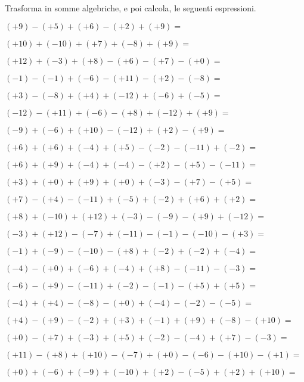 \begin{esercizio}
Trasforma in somme algebriche, e poi calcola, le seguenti espressioni.
 \label{ese:as}
 \begin{enumeratees}
\item \((+9) - (+5) + (+6) - (+2) + (+9) =\)
\item \((+10) + (-10) + (+7) + (-8) + (+9) =\)
\item \((+12) + (-3) + (+8) - (+6) - (+7) - (+0) =\)
\item \((-1) - (-1) + (-6) - (+11) - (+2) - (-8) =\)
\item \((+3) - (-8) + (+4) + (-12) + (-6) + (-5) =\)
\item \((-12) - (+11) + (-6) - (+8) + (-12) + (+9) =\)
\item \((-9) + (-6) + (+10) - (-12) + (+2) - (+9) =\)
\item \((+6) + (+6) + (-4) + (+5) - (-2) - (-11) + (-2) =\)
\item \((+6) + (+9) + (-4) + (-4) - (+2) - (+5) - (-11) =\)
\item \((+3) + (+0) + (+9) + (+0) + (-3) - (+7) - (+5) =\)
\item \((+7) - (+4) - (-11) + (-5) + (-2) + (+6) + (+2) =\)
\item \((+8) + (-10) + (+12) + (-3) - (-9) - (+9) + (-12) =\)
\item \((-3) + (+12) - (-7) + (-11) - (-1) - (-10) - (+3) =\)
\item \((-1) + (-9) - (-10) - (+8) + (-2) + (-2) + (-4) =\)
\item \((-4) - (+0) + (-6) + (-4) + (+8) - (-11) - (-3) =\)
\item \((-6) - (+9) - (-11) + (-2) - (-1) - (+5) + (+5) =\)
\item \((-4) + (+4) - (-8) - (+0) + (-4) - (-2) - (-5) =\)
\item \((+4) - (+9) - (-2) + (+3) + (-1) + (+9) + (-8) - (+10) =\)
\item \((+0) - (+7) + (-3) + (+5) + (-2) - (-4) + (+7) - (-3) =\)
\item \((+11) - (+8) + (+10) - (-7) + (+0) - (-6) - (+10) - (+1) =\)
\item \((+0) + (-6) + (-9) + (-10) + (+2) - (-5) + (+2) + (+10) =\)
\end{enumeratees}
\end{esercizio}

